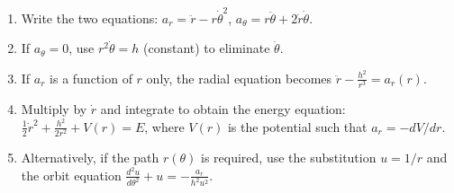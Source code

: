 \documentclass[11pt]{article}
\begin{document}
\begin{methode}
\begin{enumerate}
\item Write the two equations:
$a_r = \ddot{r} - r\dot{\theta}^2$,
$a_\theta = r\ddot{\theta} + 2\dot{r}\dot{\theta}$.
\item If $a_\theta = 0$, use $r^2\dot{\theta} = h$ (constant) to eliminate $\dot{\theta}$.
\item If $a_r$ is a function of $r$ only, the radial equation becomes $\ddot{r} - \frac{h^2}{r^3} = a_r(r)$.
\item Multiply by $\dot{r}$ and integrate to obtain the energy equation: $\frac{1}{2}\dot{r}^2 + \frac{h^2}{2r^2} + V(r) = E$, where $V(r)$ is the potential such that $a_r = -dV/dr$.
\item Alternatively, if the path $r(\theta)$ is required, use the substitution $u = 1/r$ and the orbit equation $\frac{d^2u}{d\theta^2} + u = -\frac{a_r}{h^2 u^2}$.
\end{enumerate}
\end{methode}
\end{document}
